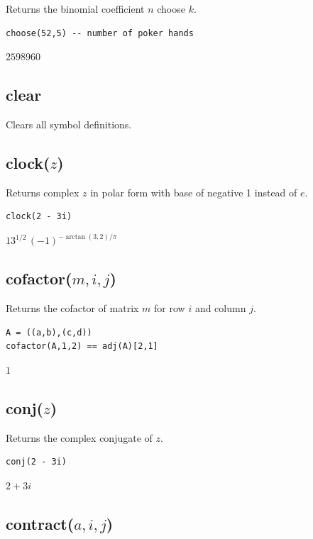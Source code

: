 \documentclass[12pt]{article}
\begin{document}
Returns the binomial coefficient $n$ choose $k$.

{\color{blue}
\begin{verbatim}
choose(52,5) -- number of poker hands
\end{verbatim}
}

$2598960$

\subsection*{clear}

Clears all symbol definitions.

\subsection*{clock($z$)}

Returns complex $z$ in polar form with base of negative 1 instead of $e$.

{\color{blue}
\begin{verbatim}
clock(2 - 3i)
\end{verbatim}
}

$13^{1/2}\,(-1)^{-\arctan(3,2)/\pi}$

\subsection*{cofactor($m,i,j$)}

Returns the cofactor of matrix $m$ for row $i$ and column $j$.

{\color{blue}
\begin{verbatim}
A = ((a,b),(c,d))
cofactor(A,1,2) == adj(A)[2,1]
\end{verbatim}
}

$1$

\subsection*{conj($z$)}

Returns the complex conjugate of $z$.

{\color{blue}
\begin{verbatim}
conj(2 - 3i)
\end{verbatim}
}

$2 + 3 i$

\subsection*{contract($a,i,j$)}
\end{document}
